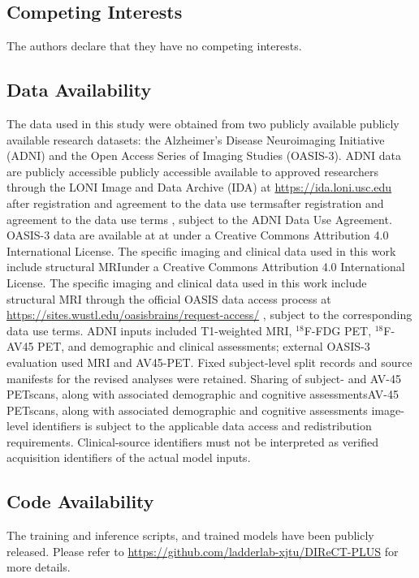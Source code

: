 \documentclass{article}
\providecommand{\DIFaddtex}[1]{{\protect\color{blue} \sf #1}} %
\providecommand{\DIFdeltex}[1]{{\protect\color{red} \ifmmode #1\else\scriptsize #1\fi}} %
\providecommand{\DIFaddbegin}{} %
\providecommand{\DIFaddend}{} %
\providecommand{\DIFdelbegin}{} %
\providecommand{\DIFdelend}{} %
\providecommand{\DIFadd}[1]{\texorpdfstring{\DIFaddtex{#1}}{#1}} %
\providecommand{\DIFdel}[1]{\texorpdfstring{\DIFdeltex{#1}}{}} %
\newcommand{\DIFscaledelfig}{0.5}
\newlength{\DIFdelgraphicswidth} %
\newlength{\DIFdelgraphicsheight} %
\newcommand{\DIFaddincludegraphics}[2][]{{\color{blue}\fbox{\DIFOincludegraphics[#1]{#2}}}} %
\newcommand{\DIFdelincludegraphics}[2][]{%
\sbox{\DIFdelgraphicsbox}{\DIFOincludegraphics[#1]{#2}}%
\settoboxwidth{\DIFdelgraphicswidth}{\DIFdelgraphicsbox} %
\settoboxtotalheight{\DIFdelgraphicsheight}{\DIFdelgraphicsbox} %
\scalebox{\DIFscaledelfig}{%
\parbox[b]{\DIFdelgraphicswidth}{\usebox{\DIFdelgraphicsbox}\\[-\baselineskip] \rule{\DIFdelgraphicswidth}{0em}}\llap{\resizebox{\DIFdelgraphicswidth}{\DIFdelgraphicsheight}{%
\setlength{\unitlength}{\DIFdelgraphicswidth}%
\begin{picture}(1,1)%
\thicklines\linethickness{2pt} %
{\color[rgb]{1,0,0}\put(0,0){\framebox(1,1){}}}%
{\color[rgb]{1,0,0}\put(0,0){\line( 1,1){1}}}%
{\color[rgb]{1,0,0}\put(0,1){\line(1,-1){1}}}%
\end{picture}%
}\hspace*{3pt}}} %
} %
\DeclareRobustCommand{\DIFaddbegin}{\DIFOaddbegin \let\includegraphics\DIFaddincludegraphics} %
\DeclareRobustCommand{\DIFaddend}{\DIFOaddend \let\includegraphics\DIFOincludegraphics} %
\DeclareRobustCommand{\DIFdelbegin}{\DIFOdelbegin \let\includegraphics\DIFdelincludegraphics} %
\DeclareRobustCommand{\DIFdelend}{\DIFOaddend \let\includegraphics\DIFOincludegraphics} %
\begin{document}
\subsection*{Competing Interests}
The authors declare that they have no competing interests.

\subsection*{Data Availability}
The data used in this study were obtained from two \DIFdelbegin \DIFdel{publicly available }\DIFdelend \DIFaddbegin \DIFadd{research }\DIFaddend datasets: the Alzheimer's Disease Neuroimaging Initiative (ADNI) and the Open Access Series of Imaging Studies (OASIS-3). ADNI data are \DIFdelbegin \DIFdel{publicly accessible }\DIFdelend \DIFaddbegin \DIFadd{available to approved researchers }\DIFaddend through the LONI Image and Data Archive (IDA) at \url{https://ida.loni.usc.edu}\DIFdelbegin \DIFdel{after registration and agreement to the data use terms}\DIFdelend \DIFaddbegin \DIFadd{, subject to the ADNI Data Use Agreement}\DIFaddend . OASIS-3 data are available \DIFdelbegin \DIFdel{at }%
\DIFdel{under a Creative Commons Attribution 4.0 International License. The specific imaging and clinical data used in this work include structural MRI}\DIFdelend \DIFaddbegin \DIFadd{through the official OASIS data access process at }\url{https://sites.wustl.edu/oasisbrains/request-access/}\DIFadd{, subject to the corresponding data use terms. ADNI inputs included T1-weighted MRI, $^{18}$F-FDG PET, $^{18}$F-AV45 PET, and demographic and clinical assessments; external OASIS-3 evaluation used MRI and AV45-PET. Fixed subject-level split records and source manifests for the revised analyses were retained. Sharing of subject- }\DIFaddend and \DIFdelbegin \DIFdel{AV-45 PETscans, along with associated demographic and cognitive assessments}\DIFdelend \DIFaddbegin \DIFadd{image-level identifiers is subject to the applicable data access and redistribution requirements. Clinical-source identifiers must not be interpreted as verified acquisition identifiers of the actual model inputs}\DIFaddend .

\subsection*{Code Availability}
The training and inference scripts, and trained models have been publicly released. Please refer to \url{https://github.com/ladderlab-xjtu/DIReCT-PLUS} for more details.
\end{document}
